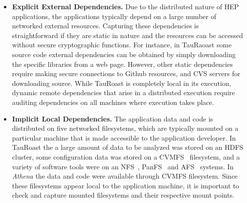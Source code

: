 \begin{itemize}

\item {\bf Explicit External Dependencies.}  Due to the distributed nature of HEP applications, the applications typically depend on a large number of networked external resources. 
Capturing these dependencies is straightforward if they are static in nature and the resources can be accessed without secure cryptographic functions. 
For instance, in TauRaoast some source code external dependencies can be obtained by simply downloading the specific libraries from a web page. 
However, other static dependencies require making secure connections to Github resources, and CVS servers for downloading source. 
While TauRoast is completely local in its execution, dynamic remote dependencies that arise in a distributed execution require auditing dependencies on all machines where execution takes place. 


\item {\bf Implicit Local Dependencies.} The application data and code is distributed on five networked filesystems, which are 
typically mounted on a particular machine that is made accessible to the application developer. In TauRoast the a large amount of data to be analyzed was stored on an HDFS~\cite{borthakur2008hdfs} cluster,
some configuration data was stored on a CVMFS~\cite{blomer2011cernvm} filesystem,
and a variety of software tools were on an NFS~\cite{howard1988scale},
PanFS~\cite{welch2008scalable} and AFS~\cite{sandberg1985design} systems. In \emph{Athena} the data and code were available through CVMFS filesystem. 
Since these filesystems appear local to the application machine, it is important to check and capture mounted filesystems and their respective mount points. 


\end{itemize}
